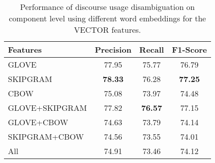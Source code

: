 \begin{table}[ht]
\centering
\begin{tabular}{|l|c|c|c|}
\hline

    Features        &     Precision &     Recall &     F1-Score \\ \hline
    GLOVE           &     77.95     &     75.77  &     76.79    \\ \hline
    SKIPGRAM        & \bf 78.33     &     76.28  & \bf 77.25    \\ \hline
    CBOW            &     75.08     &     73.97  &     74.48    \\ \hline
    GLOVE+SKIPGRAM  &     77.82     & \bf 76.57  &     77.15    \\ \hline
    GLOVE+CBOW      &     74.63     &     73.79  &     74.14    \\ \hline
    SKIPGRAM+CBOW   &     74.56     &     73.55  &     74.01    \\ \hline
    All             &     74.91     &     73.46  &     74.12    \\ \hline

\end{tabular}
\caption{\label{t:recognition-vectors} Performance of discourse usage
disambiguation on component level using different word embeddings for
the VECTOR features. }
\end{table}

